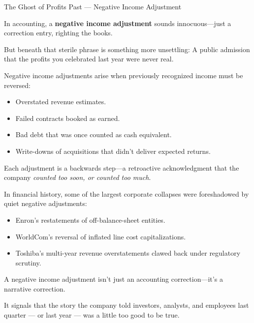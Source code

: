 \begin{HistoricalSidebar}{The Ghost of Profits Past --- Negative Income Adjustment}
  
  In accounting, a \textbf{negative income adjustment} sounds innocuous—just a correction entry, righting the books.
  
  \medskip
  
  But beneath that sterile phrase is something more unsettling:  
  A public admission that the profits you celebrated last year were never real.
  
  \medskip
  
  Negative income adjustments arise when previously recognized income must be reversed:

  \medskip

  \begin{itemize}
      \item Overstated revenue estimates.
      \item Failed contracts booked as earned.
      \item Bad debt that was once counted as cash equivalent.
      \item Write-downs of acquisitions that didn’t deliver expected returns.
  \end{itemize}

  \medskip
  
  Each adjustment is a backwards step—a retroactive acknowledgment that the company \textit{counted too soon, or counted too much}.
  
  \medskip
  
  In financial history, some of the largest corporate collapses were foreshadowed by quiet negative adjustments:
  
  \medskip
  
  \begin{itemize}
      \item Enron’s restatements of off-balance-sheet entities.
      \item WorldCom’s reversal of inflated line cost capitalizations.
      \item Toshiba’s multi-year revenue overstatements clawed back under regulatory scrutiny.
  \end{itemize}
  
  \medskip
  
  A negative income adjustment isn’t just an accounting correction—it’s a narrative correction.
  
  \medskip
  
  It signals that the story the company told investors, analysts, and employees last quarter --- or last year --- was a little too good to be true.
  

\end{HistoricalSidebar}
